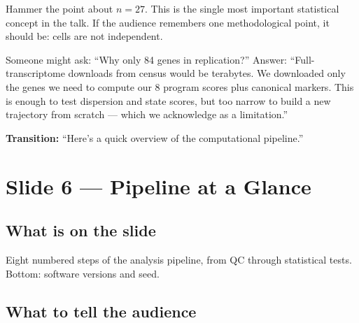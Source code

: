 \documentclass[11pt]{article}
\begin{document}
\begin{resultbox}
Hammer the point about $n = 27$. This is the single most important statistical concept in the talk. If the audience remembers one methodological point, it should be: cells are not independent.
\end{resultbox}

\begin{pitfall}
Someone might ask: ``Why only 84 genes in replication?'' Answer: ``Full-transcriptome downloads from census would be terabytes. We downloaded only the genes we need to compute our 8 program scores plus canonical markers. This is enough to test dispersion and state scores, but too narrow to build a new trajectory from scratch --- which we acknowledge as a limitation.''
\end{pitfall}

\textbf{Transition:} ``Here's a quick overview of the computational pipeline.''


\section{Slide 6 --- Pipeline at a Glance}

\subsection{What is on the slide}

Eight numbered steps of the analysis pipeline, from QC through statistical tests. Bottom: software versions and seed.

\subsection{What to tell the audience}
\end{document}
